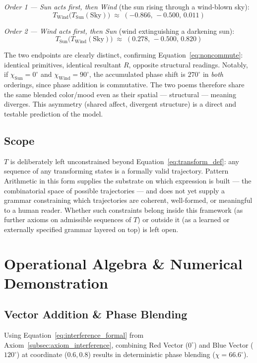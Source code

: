 \documentclass[12pt, a4paper]{article}
\begin{document}
\emph{Order 1 --- Sun acts first, then Wind} (the sun rising through a
wind-blown sky):
\begin{equation}
    T_{\text{Wind}}\big(T_{\text{Sun}}(\text{Sky})\big) \;\approx\; (-0.866,\, -0.500,\, 0.011)
\end{equation}

\emph{Order 2 --- Wind acts first, then Sun} (wind extinguishing a
darkening sun):
\begin{equation}
    T_{\text{Sun}}\big(T_{\text{Wind}}(\text{Sky})\big) \;\approx\; (0.278,\, -0.500,\, 0.820)
\end{equation}

The two endpoints are clearly distinct, confirming
Equation~\eqref{eq:noncommute}: identical primitives, identical
resultant $R$, opposite structural readings. Notably, if $\chi_{\text{Sun}}
= 0^\circ$ and $\chi_{\text{Wind}} = 90^\circ$, the accumulated phase
shift is $270^\circ$ in \emph{both} orderings, since phase addition is
commutative. The two poems therefore share the same blended color/mood
even as their spatial --- structural --- meaning diverges. This
asymmetry (shared affect, divergent structure) is a direct and
testable prediction of the model.

\subsection{Scope}
\label{subsec:transform_scope}
$T$ is deliberately left unconstrained beyond
Equation~\eqref{eq:transform_def}: any sequence of any transforming
states is a formally valid trajectory. Pattern Arithmetic in this form
supplies the substrate on which expression is built --- the
combinatorial space of possible trajectories --- and does not yet
supply a grammar constraining which trajectories are coherent,
well-formed, or meaningful to a human reader. Whether such constraints
belong inside this framework (as further axioms on admissible
sequences of $T$) or outside it (as a learned or externally specified
grammar layered on top) is left open.

\section{Operational Algebra \& Numerical Demonstration}

\subsection{Vector Addition \& Phase Blending}
Using Equation~\eqref{eq:interference_formal} from Axiom~\ref{subsec:axiom_interference}, combining Red Vector ($0^\circ$) and Blue Vector ($120^\circ$) at coordinate ($0.6, 0.8$) results in deterministic phase blending ($\chi = 66.6^\circ$).
\end{document}
